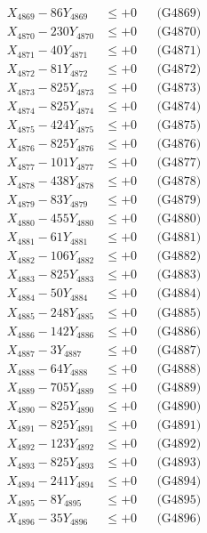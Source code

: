 \documentclass[a4paper,10pt]{article}
\begin{document}
{\begin{align}
X_{4869} - 86Y_{4869} &\leq +0 && \text{(G4869)} \\
X_{4870} - 230Y_{4870} &\leq +0 && \text{(G4870)} \\
\allowbreak
X_{4871} - 40Y_{4871} &\leq +0 && \text{(G4871)} \\
X_{4872} - 81Y_{4872} &\leq +0 && \text{(G4872)} \\
X_{4873} - 825Y_{4873} &\leq +0 && \text{(G4873)} \\
X_{4874} - 825Y_{4874} &\leq +0 && \text{(G4874)} \\
X_{4875} - 424Y_{4875} &\leq +0 && \text{(G4875)} \\
X_{4876} - 825Y_{4876} &\leq +0 && \text{(G4876)} \\
X_{4877} - 101Y_{4877} &\leq +0 && \text{(G4877)} \\
X_{4878} - 438Y_{4878} &\leq +0 && \text{(G4878)} \\
X_{4879} - 83Y_{4879} &\leq +0 && \text{(G4879)} \\
X_{4880} - 455Y_{4880} &\leq +0 && \text{(G4880)} \\
\allowbreak
X_{4881} - 61Y_{4881} &\leq +0 && \text{(G4881)} \\
X_{4882} - 106Y_{4882} &\leq +0 && \text{(G4882)} \\
X_{4883} - 825Y_{4883} &\leq +0 && \text{(G4883)} \\
X_{4884} - 50Y_{4884} &\leq +0 && \text{(G4884)} \\
X_{4885} - 248Y_{4885} &\leq +0 && \text{(G4885)} \\
X_{4886} - 142Y_{4886} &\leq +0 && \text{(G4886)} \\
X_{4887} - 3Y_{4887} &\leq +0 && \text{(G4887)} \\
X_{4888} - 64Y_{4888} &\leq +0 && \text{(G4888)} \\
X_{4889} - 705Y_{4889} &\leq +0 && \text{(G4889)} \\
X_{4890} - 825Y_{4890} &\leq +0 && \text{(G4890)} \\
\allowbreak
X_{4891} - 825Y_{4891} &\leq +0 && \text{(G4891)} \\
X_{4892} - 123Y_{4892} &\leq +0 && \text{(G4892)} \\
X_{4893} - 825Y_{4893} &\leq +0 && \text{(G4893)} \\
X_{4894} - 241Y_{4894} &\leq +0 && \text{(G4894)} \\
X_{4895} - 8Y_{4895} &\leq +0 && \text{(G4895)} \\
X_{4896} - 35Y_{4896} &\leq +0 && \text{(G4896)} \\

\end{align}}
\end{document}
